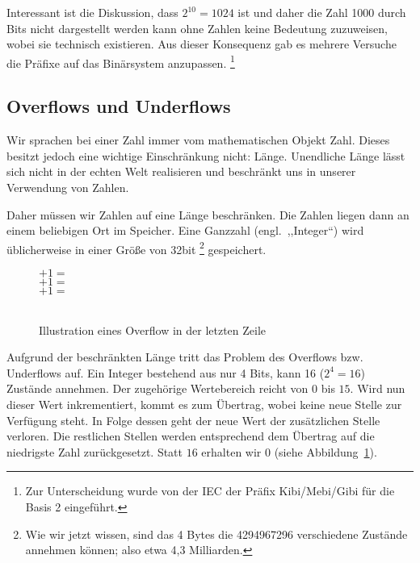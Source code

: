 Interessant ist die Diskussion, dass $2^{10} = 1024$ ist und
daher die Zahl 1000 durch Bits nicht dargestellt werden kann ohne
Zahlen keine Bedeutung zuzuweisen, wobei sie technisch existieren.
Aus dieser Konsequenz gab es mehrere Versuche die Präfixe
auf das Binärsystem anzupassen.%
\footnote{Zur Unterscheidung wurde von der IEC der Präfix Kibi/Mebi/Gibi
für die Basis 2 eingeführt.}

\subsection{Overflows und Underflows}
%
Wir sprachen bei einer Zahl immer vom mathematischen Objekt Zahl. Dieses
besitzt jedoch eine wichtige Einschränkung nicht: Länge. Unendliche Länge
lässt sich nicht in der echten Welt realisieren und beschränkt uns in
unserer Verwendung von Zahlen.

Daher müssen wir Zahlen auf eine Länge beschränken. Die Zahlen liegen
dann an einem beliebigen Ort im Speicher. Eine Ganzzahl (engl.~,,Integer``)
wird üblicherweise in einer Größe von 32bit%
\footnote{Wie wir jetzt wissen, sind das 4 Bytes die 4294967296
verschiedene Zustände annehmen können; also etwa 4,3 Milliarden.}
gespeichert.

\begin{figure}[ht]
  \begin{center}
        $+ 1 =$ \\
        $+ 1 =$ \\
        $+ 1 =$ \\
        \hspace{27.5pt}~
  \end{center}
  \caption{Illustration eines Overflow in der letzten Zeile}
  \label{fig:overflow}
\end{figure}
%
Aufgrund der beschränkten Länge tritt das Problem des Overflows bzw.
Underflows auf. Ein Integer bestehend aus nur 4 Bits, kann 16 ($2^4 = 16$)
Zustände annehmen. Der zugehörige Wertebereich reicht von $0$ bis $15$.
Wird nun dieser Wert inkrementiert, kommt es zum Übertrag, wobei keine
neue Stelle zur Verfügung steht. In Folge dessen geht der neue Wert der
zusätzlichen Stelle verloren. Die restlichen Stellen werden entsprechend
dem Übertrag auf die niedrigste Zahl zurückgesetzt. Statt $16$ erhalten wir
$0$ (siehe Abbildung~\ref{fig:overflow}).


